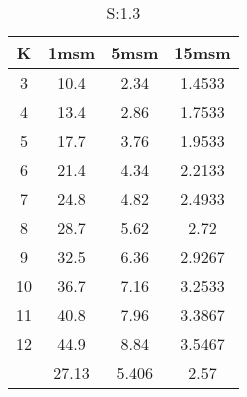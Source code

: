 \begin{table}[H]
\centering
\begin{tabular}{c|ccc}
K &1msm &5msm &15msm\\
\hline
3 & 10.4 & 2.34 & 1.4533\\
4 & 13.4 & 2.86 & 1.7533\\
5 & 17.7 & 3.76 & 1.9533\\
6 & 21.4 & 4.34 & 2.2133\\
7 & 24.8 & 4.82 & 2.4933\\
8 & 28.7 & 5.62 & 2.72\\
9 & 32.5 & 6.36 & 2.9267\\
10 & 36.7 & 7.16 & 3.2533\\
11 & 40.8 & 7.96 & 3.3867\\
12 & 44.9 & 8.84 & 3.5467\\
\hline
& 27.13 & 5.406 & 2.57\\
\end{tabular}
\caption{S:1.3}
\label{tab:s1.3}
\end{table}
